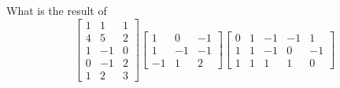 \bexo
What is the result of 
\begin{equation*}
\left[
\begin{array}{ccc}
1  &   1  &   1\\
4  &   5  &   2\\
1  &  -1  &   0\\
0  &  -1  &   2\\
1  &   2  &   3
\end{array}
\right]
\left[
\begin{array}{ccc}
1  &   0  &  -1\\
1  &  -1  &  -1\\
-1  &   1  &   2
\end{array}
\right]
\left[
\begin{array}{ccccc}
0  &   1  &  -1  &  -1  &   1\\
1  &   1  &  -1  &   0  &  -1\\
1  &   1  &   1  &   1  &   0
\end{array}
\right]
\end{equation*}
\eexo
{}

